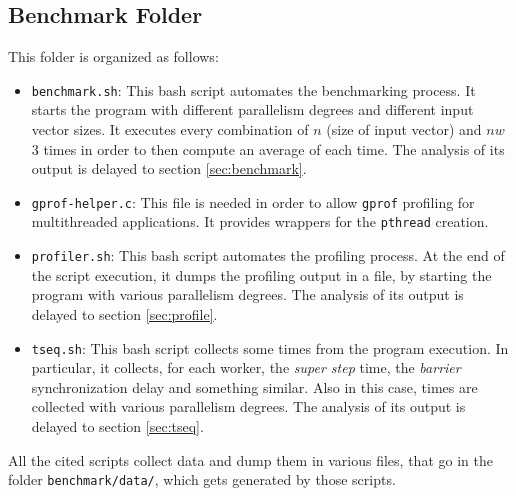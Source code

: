 \documentclass[]{article}
\def\code#1{\texttt{#1}}
\begin{document}
\subsection{Benchmark Folder}
\label{sec:benchFold}
This folder is organized as follows:
\begin{itemize}
	\item \code{benchmark.sh}: This bash script automates the benchmarking process. It starts the program with different parallelism degrees and different input vector sizes. It executes every combination of $n$ (size of input vector) and $\mathit{nw}$ 3 times in order to then compute an average of each time. The analysis of its output is delayed to section \ref{sec:benchmark}.
	\item \code{gprof-helper.c}: This file is needed in order to allow \code{gprof} profiling for multithreaded applications. It provides wrappers for the \code{pthread} creation.
	\item \code{profiler.sh}: This bash script automates the profiling process. At the end of the script execution, it dumps the profiling output in a file, by starting the program with various parallelism degrees. The analysis of its output is delayed to section \ref{sec:profile}.
	\item \code{tseq.sh}: This bash script collects some times from the program execution. In particular, it collects, for each worker, the \emph{super step} time, the \emph{barrier} synchronization delay and something similar. Also in this case, times are collected with various parallelism degrees. The analysis of its output is delayed to section \ref{sec:tseq}.
\end{itemize}
All the cited scripts collect data and dump them in various files, that go in the folder \code{benchmark/data/}, which gets generated by those scripts.
\end{document}
